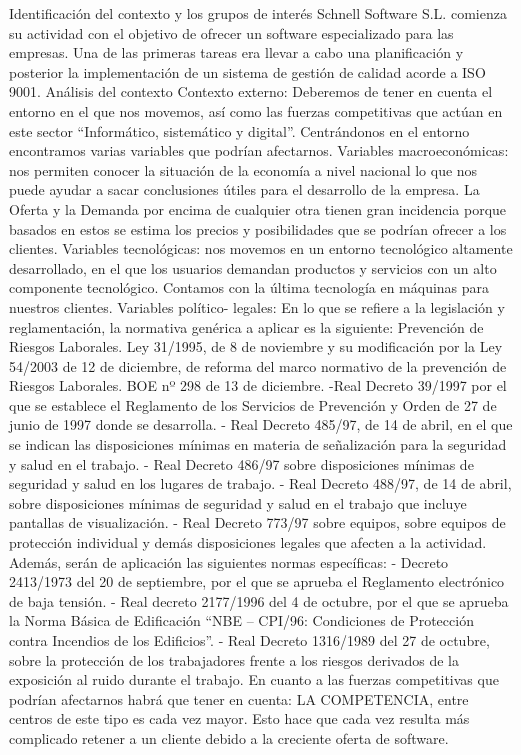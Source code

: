 \documentclass[10pt,a4paper]{article}
\begin{document}
\begin{enumerate}
Identificación del contexto y los grupos de interés
Schnell Software S.L. comienza su actividad con el objetivo de ofrecer un software especializado para las empresas. Una de las primeras tareas era llevar a cabo una planificación y posterior la implementación de un sistema de gestión de calidad acorde a ISO 9001.
Análisis del contexto
Contexto externo: Deberemos de tener en cuenta el entorno en el que nos movemos, así como las fuerzas competitivas que actúan en este sector “Informático, sistemático y digital”.
Centrándonos en el entorno encontramos varias variables que podrían afectarnos.
Variables macroeconómicas: nos permiten conocer la situación de la economía a nivel nacional lo que nos puede ayudar a sacar conclusiones útiles para el desarrollo de la empresa. La Oferta y la Demanda por encima de cualquier otra tienen gran incidencia porque basados en estos se estima los precios y posibilidades que se podrían ofrecer a los clientes.
Variables tecnológicas: nos movemos en un entorno tecnológico altamente desarrollado, en el que los usuarios demandan productos y servicios con un alto componente tecnológico. Contamos con la última tecnología en máquinas para nuestros clientes. 
Variables político- legales: En lo que se refiere a la legislación y reglamentación, la normativa genérica a aplicar es la siguiente: 
Prevención de Riesgos Laborales. Ley 31/1995, de 8 de noviembre y su modificación por la Ley 54/2003 de 12 de diciembre, de reforma del marco normativo de la prevención de Riesgos Laborales. BOE nº 298 de 13 de diciembre.
-Real Decreto 39/1997 por el que se establece el Reglamento de los Servicios de Prevención y Orden de 27 de junio de 1997 donde se desarrolla. 
- Real Decreto 485/97, de 14 de abril, en el que se indican las disposiciones mínimas en materia de señalización para la seguridad y salud en el trabajo.
- Real Decreto 486/97 sobre disposiciones mínimas de seguridad y salud en los lugares de trabajo.
- Real Decreto 488/97, de 14 de abril, sobre disposiciones mínimas de seguridad y salud en el trabajo que incluye pantallas de visualización. 
- Real Decreto 773/97 sobre equipos, sobre equipos de protección individual y demás disposiciones legales que afecten a la actividad. Además, serán de aplicación las siguientes normas específicas: 
- Decreto 2413/1973 del 20 de septiembre, por el que se aprueba el Reglamento electrónico de baja tensión. 
- Real decreto 2177/1996 del 4 de octubre, por el que se aprueba la Norma Básica de Edificación “NBE – CPI/96: Condiciones de Protección contra Incendios de los Edificios”. 
- Real Decreto 1316/1989 del 27 de octubre, sobre la protección de los trabajadores frente a los riesgos derivados de la exposición al ruido durante el trabajo.
En cuanto a las fuerzas competitivas que podrían afectarnos habrá que tener en cuenta: LA COMPETENCIA, entre centros de este tipo es cada vez mayor. Esto hace que cada vez resulta más complicado retener a un cliente debido a la creciente oferta de software.


\end{enumerate}
\end{document}
